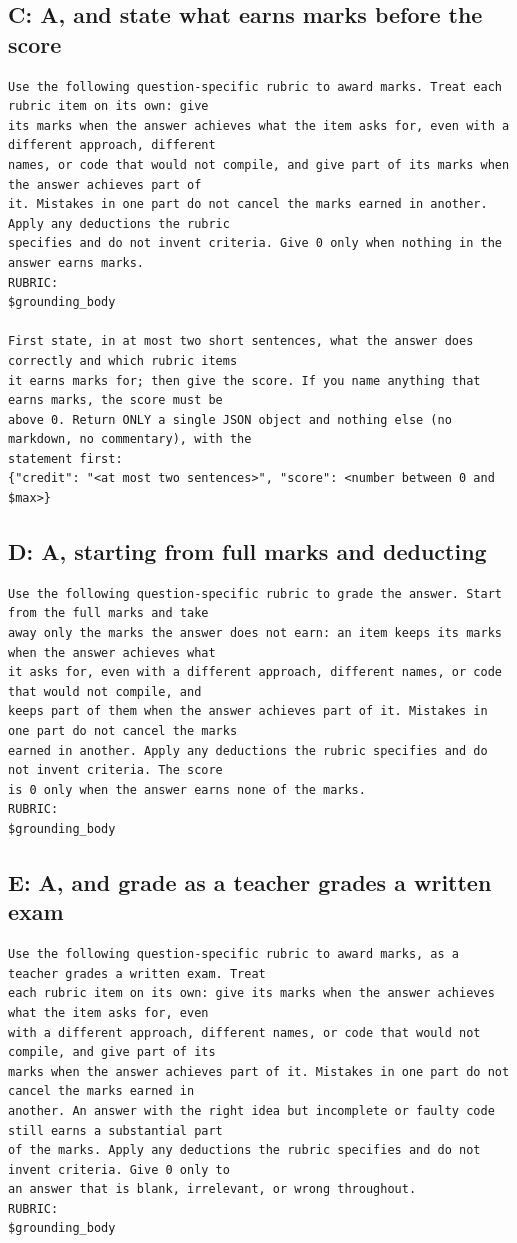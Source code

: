 \documentclass[10pt]{article}
\begin{document}
\subsection*{C: A, and state what earns marks before the score}
\begin{Verbatim}[fontsize=\footnotesize]
Use the following question-specific rubric to award marks. Treat each rubric item on its own: give
its marks when the answer achieves what the item asks for, even with a different approach, different
names, or code that would not compile, and give part of its marks when the answer achieves part of
it. Mistakes in one part do not cancel the marks earned in another. Apply any deductions the rubric
specifies and do not invent criteria. Give 0 only when nothing in the answer earns marks.
RUBRIC:
$grounding_body

First state, in at most two short sentences, what the answer does correctly and which rubric items
it earns marks for; then give the score. If you name anything that earns marks, the score must be
above 0. Return ONLY a single JSON object and nothing else (no markdown, no commentary), with the
statement first:
{"credit": "<at most two sentences>", "score": <number between 0 and $max>}
\end{Verbatim}
\subsection*{D: A, starting from full marks and deducting}
\begin{Verbatim}[fontsize=\footnotesize]
Use the following question-specific rubric to grade the answer. Start from the full marks and take
away only the marks the answer does not earn: an item keeps its marks when the answer achieves what
it asks for, even with a different approach, different names, or code that would not compile, and
keeps part of them when the answer achieves part of it. Mistakes in one part do not cancel the marks
earned in another. Apply any deductions the rubric specifies and do not invent criteria. The score
is 0 only when the answer earns none of the marks.
RUBRIC:
$grounding_body
\end{Verbatim}
\subsection*{E: A, and grade as a teacher grades a written exam}
\begin{Verbatim}[fontsize=\footnotesize]
Use the following question-specific rubric to award marks, as a teacher grades a written exam. Treat
each rubric item on its own: give its marks when the answer achieves what the item asks for, even
with a different approach, different names, or code that would not compile, and give part of its
marks when the answer achieves part of it. Mistakes in one part do not cancel the marks earned in
another. An answer with the right idea but incomplete or faulty code still earns a substantial part
of the marks. Apply any deductions the rubric specifies and do not invent criteria. Give 0 only to
an answer that is blank, irrelevant, or wrong throughout.
RUBRIC:
$grounding_body
\end{Verbatim}
\end{document}
